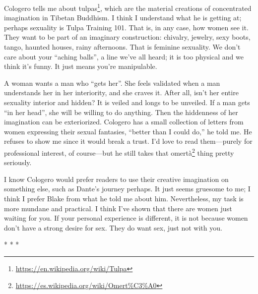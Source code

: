 Cologero tells me about tulpas\footnote{\url{https://en.wikipedia.org/wiki/Tulpa}}, which are the material creations of concentrated imagination in Tibetan Buddhism. I think I understand what he is getting at; perhaps sexuality is Tulpa Training 101. That is, in any case, how women see it. They want to be part of an imaginary construction: chivalry, jewelry, sexy boots, tango, haunted houses, rainy afternoons. That is feminine sexuality. We don't care about your ``aching balls'', a line we've all heard; it is too physical and we think it's funny. It just means you're manipulable.

A woman wants a man who ``gets her''. She feels validated when a man understands her in her interiority, and she craves it. After all, isn't her entire sexuality interior and hidden? It is veiled and longs to be unveiled. If a man gets ``in her head'', she will be willing to do anything. Then the hiddenness of her imagination can be exteriorized. Cologero has a small collection of letters from women expressing their sexual fantasies, ``better than I could do,'' he told me. He refuses to show me since it would break a trust. I'd love to read them---purely for professional interest, of course---but he still takes that omertà\footnote{\url{https://es.wikipedia.org/wiki/Omert\%C3\%A0}} thing pretty seriously.

I know Cologero would prefer readers to use their creative imagination on something else, such as Dante's journey perhaps. It just seems gruesome to me; I think I prefer Blake from what he told me about him. Nevertheless, my task is more mundane and practical. I think I've shown that there are women just waiting for you. If your personal experience is different, it is not because women don't have a strong desire for sex. They do want sex, just not with you.



\begin{center}* * *\end{center}

